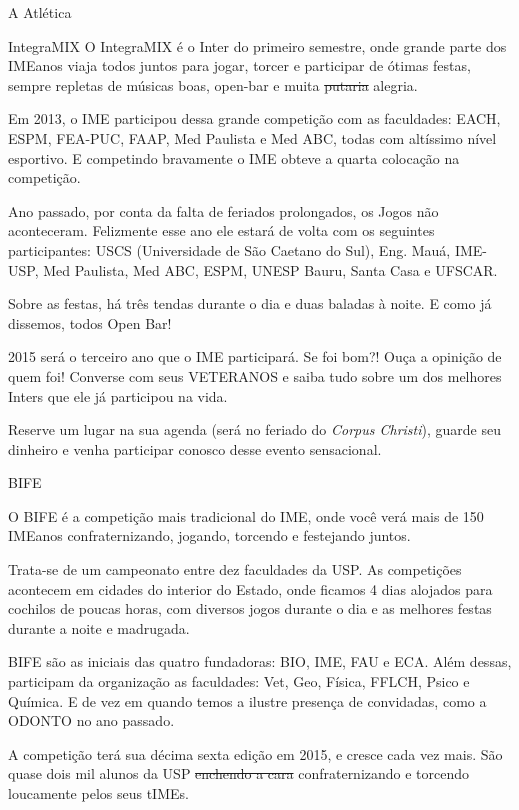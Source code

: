 \begin{secao}{A Atlética}
\begin{subsecao}{IntegraMIX}
O IntegraMIX é o Inter do primeiro semestre, onde grande parte dos IMEanos
viaja todos juntos para jogar, torcer e participar de ótimas festas, sempre
repletas de músicas boas, open-bar e muita \sout{putaria} alegria.

Em 2013, o IME participou dessa grande competição com as faculdades:
EACH, ESPM, FEA-PUC, FAAP, Med Paulista e Med ABC, todas com altíssimo nível
esportivo. E competindo bravamente o IME obteve a quarta colocação na
competição.

Ano passado, por conta da falta de feriados prolongados, os Jogos não aconteceram.
Felizmente esse ano ele estará de volta com os seguintes participantes:
USCS (Universidade de São Caetano do Sul), Eng. Mauá, IME-USP,  Med Paulista,
Med ABC, ESPM, UNESP Bauru, Santa Casa e UFSCAR.

Sobre as festas, há três tendas durante o dia e duas baladas à noite.
E como já dissemos, todos Open Bar!

2015 será o terceiro ano que o IME participará. Se foi bom?! Ouça a opinição de 
quem foi! Converse com seus VETERANOS e saiba tudo sobre um dos melhores Inters
que ele já participou na vida.

Reserve um lugar na sua agenda (será no feriado do \textit{Corpus Christi}),
guarde seu dinheiro e venha participar conosco desse evento sensacional.


\end{subsecao}
\begin{subsecao}{BIFE}

O BIFE é a competição mais tradicional do IME, onde você verá mais de 150
IMEanos confraternizando, jogando, torcendo e festejando juntos.

Trata-se de um campeonato entre dez faculdades da USP. As competições acontecem em cidades do interior do Estado, onde ficamos 4 dias
alojados para cochilos de poucas horas, com diversos jogos durante o dia e as
melhores festas durante a noite e madrugada.

BIFE são as iniciais das quatro fundadoras: BIO, IME, FAU e ECA.
Além dessas, participam da organização as faculdades: Vet, Geo, Física, FFLCH,
Psico e Química. E de vez em quando temos a ilustre presença de convidadas, como
a ODONTO no ano passado. %

A competição terá sua décima sexta edição em 2015, e cresce cada vez mais. %
São quase dois mil alunos da USP \sout{enchendo a cara} confraternizando e
torcendo loucamente pelos seus tIMEs.


\end{subsecao}
\end{secao}
